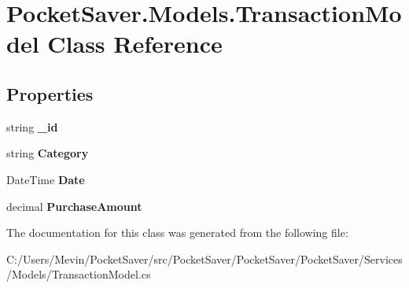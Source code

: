 \hypertarget{class_pocket_saver_1_1_models_1_1_transaction_model}{}\section{Pocket\+Saver.\+Models.\+Transaction\+Model Class Reference}
\label{class_pocket_saver_1_1_models_1_1_transaction_model}
\subsection*{Properties}
\begin{DoxyCompactItemize}
\item 
\mbox{\label{class_pocket_saver_1_1_models_1_1_transaction_model_a66392d6b5d8574181ea9db65bf2b3308}} 
string {\bfseries \+\_\+id}
\item 
\mbox{\label{class_pocket_saver_1_1_models_1_1_transaction_model_a8ea4b5bbb326f50ceb55a8ad8503a0f3}} 
string {\bfseries Category}
\item 
\mbox{\label{class_pocket_saver_1_1_models_1_1_transaction_model_a41781f1e8223daefb26255ecdac60724}} 
Date\+Time {\bfseries Date}
\item 
\mbox{\label{class_pocket_saver_1_1_models_1_1_transaction_model_a2332c4ad1344019a701fea92f2bc415e}} 
decimal {\bfseries Purchase\+Amount}
\end{DoxyCompactItemize}


The documentation for this class was generated from the following file\+:\begin{DoxyCompactItemize}
\item 
C\+:/\+Users/\+Mevin/\+Pocket\+Saver/src/\+Pocket\+Saver/\+Pocket\+Saver/\+Pocket\+Saver/\+Services/\+Models/Transaction\+Model.\+cs\end{DoxyCompactItemize}
